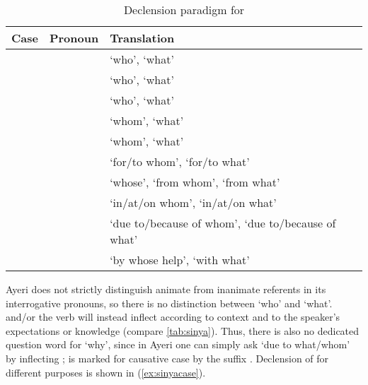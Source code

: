 \begin{table}[tp]\centering
\caption{Declension paradigm for }
\begin{tabu} to \linewidth {l l X}
\tableheaderfont\toprule
Case
	& Pronoun
	& Translation
	\\

\toprule

\Top{}
	&  %
	& `who', `what'
	\\

\midrule

\Aarg{}
	&  %
	& `who', `what'
	\\

\AargI{}
	&  %
	& `who', `what'
	\\
\Parg{}
	&  %
	& `whom', `what'
	\\
\PargI{}
	&  %
	& `whom', `what'
	\\
\Dat{}
	&  %
	& `for/to whom', `for/to what'
	\\

\midrule

\Gen{}
	&  %
	& `whose', `from whom', `from what'
	\\

\Loc{}
	&  %
	& `in/at/on whom', `in/at/on what'
	\\

\Caus{}
	&  %
	& `due to/because of whom', `due to/because of what'
	\\

\Ins{}
	&  %
	& `by whose help', `with what'
	\\

\bottomrule
\end{tabu}
\label{tab:sinya}
\end{table}

Ayeri does not strictly distinguish animate from inanimate referents in its
interrogative pronouns, so there is no distinction between `who' and `what'.
 and/or the verb will instead inflect according to context
and to the speaker's expectations or knowledge (compare \autoref{tab:sinya}).
Thus, there is also no dedicated question word for `why', since in Ayeri one
can simply ask `due to what/whom' by inflecting ;
 is  marked for causative case by the
suffix . Declension of  for different
purposes is shown in (\ref{ex:sinyacase}).

